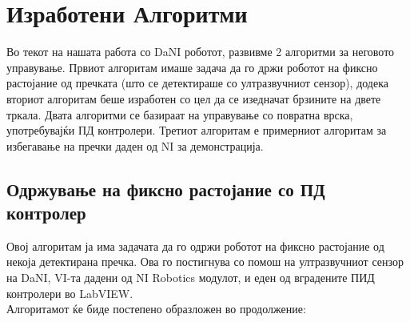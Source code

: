 \documentclass{article}
\begin{document}

\newpage

\section{Изработени Алгоритми}
Во текот на нашата работа со DaNI роботот, развивме 2 алгоритми за неговото управување. Првиот алгоритам имаше задача да го држи роботот на фиксно растојание од пречката (што се детектираше со ултразвучниот сензор), додека вториот алгоритам беше изработен со цел да се изедначат брзините на двете тркала. Двата алгоритми се базираат на управување со повратна врска, употребувајќи ПД контролери. Третиот алгоритам е примерниот алгоритам за избегавање на пречки даден од NI за демонстрација.

\subsection{Одржување на фиксно растојание со ПД контролер}
Овој алгоритам ја има задачата да го одржи роботот на фиксно растојание од некоја детектирана пречка. Ова го постигнува со помош на ултразвучниот сензор на DaNI, VI-та дадени од NI Robotics модулот, и еден од вградените ПИД контролери во LabVIEW.\\ Алгоритамот ќе биде постепено образложен во продолжение:
\end{document}
